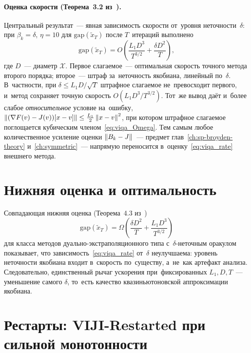 \paragraph{Оценка скорости (Теорема~3.2 из~\cite{viqa2024}).}
\label{par:viqa_rate}
Центральный результат~--- явная зависимость скорости от~уровня
неточности~$\delta$: при $\beta_k=\delta$, $\eta=10$ для
$\mathrm{gap}(\widetilde{x}_T)$ после $T$~итераций выполнено
\begin{equation}\label{eq:viqa_rate}
  \mathrm{gap}(\widetilde{x}_T)
  = O\!\left(\frac{L_1 D^3}{T^{3/2}} + \frac{\delta D^2}{T}\right),
\end{equation}
где $D$~--- диаметр $\mathcal{X}$. Первое слагаемое~--- оптимальная
скорость точного метода второго порядка; второе~--- штраф за~неточность
якобиана, линейный по~$\delta$. В~частности, при $\delta\le L_1 D/\sqrt{T}$
штрафное слагаемое не~превосходит первого, и~метод сохраняет точную
скорость $O(L_1 D^3/T^{3/2})$. Тот~же вывод даёт и~более слабое
\emph{относительное} условие на~ошибку,
$\left\|(\nabla F(v)-J(v))[x-v]\right\|\le\tfrac{L_1}{2}\left\|x-v\right\|^2$, при котором
штрафное слагаемое поглощается кубическим членом~\eqref{eq:viqa_Omega}.
Тем самым любое количественное усиление оценки $\left\|B_k-J\right\|$~--- предмет
глав~\ref{ch:sp-broyden-theory} и~\ref{ch:symmetric}~--- напрямую
переносится в~оценку~\eqref{eq:viqa_rate} внешнего метода.


\section{Нижняя оценка и оптимальность}\label{sec:viqa_lower}

Совпадающая нижняя оценка (Теорема~4.3 из~\cite{viqa2024})
\begin{equation}\label{eq:viqa_lower}
  \mathrm{gap}(\widetilde{x}_T)
  = \Omega\!\left(\frac{\delta D^2}{T} + \frac{L_1 D^3}{T^{3/2}}\right)
\end{equation}
для класса методов дуально-экстраполяционного типа с~$\delta$-неточным
оракулом показывает, что зависимость~\eqref{eq:viqa_rate} от~$\delta$
неулучшаема: уровень неточности якобиана входит в~скорость по~существу,
а~не~как артефакт анализа. Следовательно, единственный рычаг ускорения
при~фиксированных $L_1, D, T$~--- уменьшение самого $\delta$, то~есть
качество квазиньютоновской аппроксимации якобиана.


\section{Рестарты: VIJI-Restarted при сильной монотонности}\label{sec:viqa_restart}


